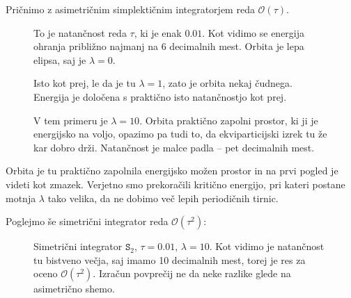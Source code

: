 \documentclass[a4 paper, 12pt]{article}
\begin{document}
Pričnimo z asimetričnim simplektičnim integratorjem reda $\mathcal{O}(\tau)$.

\begin{figure}[H]
   \begin{center}
      
   \end{center}
   \vspace{-20pt}
   \caption{To je natančnost reda $\tau$, ki je enak $0.01$. Kot vidimo se energija ohranja približno najmanj na 6 decimalnih
	mest. Orbita je lepa elipsa, saj je $\lambda = 0$.}
   \label{fig:pic-L0}
   \vspace{-10pt}
\end{figure}

\begin{figure}[H]
   \begin{center}
      
   \end{center}
   \vspace{-20pt}
   \caption{Isto kot prej, le da je tu $\lambda = 1$,  zato je orbita nekaj čudnega. Energija je določena s praktično
	 isto natančnostjo kot prej.}
   \label{fig:pic-L100}
   \vspace{-10pt}
\end{figure}

\begin{figure}[H]
   \begin{center}
      
   \end{center}
   \vspace{-20pt}
   \caption{V tem primeru je $\lambda = 10$. Orbita praktično zapolni prostor, ki ji je energijsko na voljo, opazimo pa tudi to,
	da ekviparticijski izrek tu že kar dobro drži. Natančnost je malce padla -- pet decimalnih mest.}
   \label{fig:pic-L1000}
   \vspace{-10pt}
\end{figure}

Orbita je tu praktično zapolnila energijsko možen prostor in na prvi pogled je videti kot zmazek. Verjetno smo prekoračili
kritično energijo, pri kateri postane motnja $\lambda$ tako velika, da ne dobimo več lepih periodičnih tirnic.

Poglejmo še simetrični integrator reda $\mathcal{O}(\tau^2)$:

\begin{figure}[H]
   \begin{center}
      
   \end{center}
   \vspace{-20pt}
   \caption{Simetrični integrator ${\mathtt S_2}$, $\tau = 0.01$, $\lambda = 10$. Kot vidimo je natančnost tu bistveno večja,
	saj imamo 10 decimalnih mest, torej je res za oceno $\mathcal{O}(\tau^2)$. Izračun povprečij ne da neke razlike glede
	na asimetrično shemo.}
   \label{fig:pic-L1000}
   \vspace{-10pt}
\end{figure}
\end{document}
